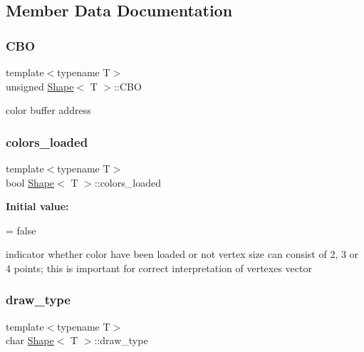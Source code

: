 \subsection{Member Data Documentation}
\mbox{\label{classShape_a66502f6f87b46a705d131dc7b0b67d42}} 
\subsubsection{\texorpdfstring{C\+BO}{CBO}}
{\footnotesize\ttfamily template$<$typename T$>$ \\
unsigned \mbox{\hyperlink{classShape}{Shape}}$<$ T $>$\+::C\+BO\hspace{0.3cm}{\ttfamily [protected]}}

color buffer address \mbox{\label{classShape_a216866713d16c882a0f0b0b0a89d350d}} 
\subsubsection{\texorpdfstring{colors\+\_\+loaded}{colors\_loaded}}
{\footnotesize\ttfamily template$<$typename T$>$ \\
bool \mbox{\hyperlink{classShape}{Shape}}$<$ T $>$\+::colors\+\_\+loaded\hspace{0.3cm}{\ttfamily [protected]}}

{\bfseries Initial value\+:}
\begin{DoxyCode}
=
        \textcolor{keyword}{false}
\end{DoxyCode}
indicator whether color have been loaded or not vertex size can consist of 2, 3 or 4 points; this is important for correct interpretation of vertexes vector \mbox{\label{classShape_a851fcb33238286342f670d27443ffdfc}} 
\subsubsection{\texorpdfstring{draw\+\_\+type}{draw\_type}}
{\footnotesize\ttfamily template$<$typename T$>$ \\
char \mbox{\hyperlink{classShape}{Shape}}$<$ T $>$\+::draw\+\_\+type\hspace{0.3cm}{\ttfamily [protected]}}

